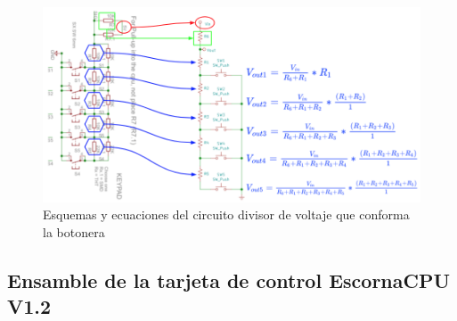 \documentclass{article}
\begin{document}
\begin{figure}[H]
    \centering
    \includegraphics[width=0.9\columnwidth]
    {images/Botonera/botonera_divisor_voltaje.png}
    \caption{Esquemas y ecuaciones del circuito divisor de voltaje que conforma la botonera}
    \label{fig:botonera_divisor_voltaje_1}
\end{figure}

\subsection{Ensamble de la tarjeta de control EscornaCPU V1.2}
\end{document}
